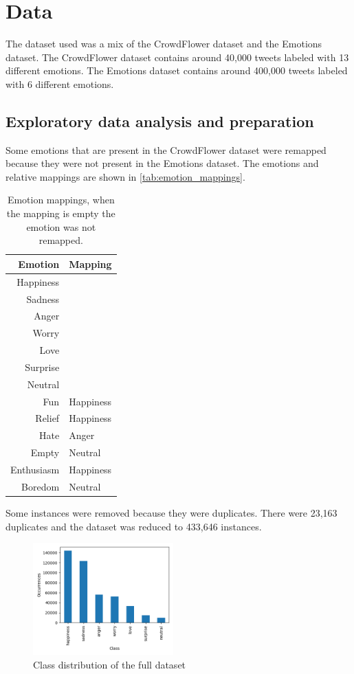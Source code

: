 \section{Data}
\label{sec:data}
The dataset used was a mix of the CrowdFlower 
dataset\cite{crowdflower_dataset} and the
Emotions dataset\cite{emotions_dataset}.
The CrowdFlower dataset contains around 40,000 tweets
labeled with 13 different emotions. The Emotions 
dataset contains around 400,000 tweets labeled with 6 
different emotions.

\subsection{Exploratory data analysis and preparation}
Some emotions that are present in the
CrowdFlower dataset were remapped because they
were not present in the Emotions dataset.
The emotions and relative mappings are shown
in \autoref{tab:emotion_mappings}.

\begin{table}[H]
    \centering
    \begin{tabular}{|r|l|}
        \hline
        Emotion & Mapping \\
        \hline
        Happiness & \\
        Sadness & \\
        Anger & \\
        Worry & \\
        Love & \\
        Surprise & \\
        Neutral & \\
        Fun  & Happiness \\
        Relief  & Happiness \\
        Hate  & Anger \\
        Empty  & Neutral \\
        Enthusiasm  & Happiness \\
        Boredom  & Neutral \\
        \hline
    \end{tabular}
    \caption{Emotion mappings, when the mapping is empty the emotion was not remapped.}
    \label{tab:emotion_mappings}
\end{table}

Some instances were removed because they were
duplicates. There were 23,163 duplicates and the
dataset was reduced to 433,646 instances.

\begin{figure}[H]
    \centering
    \includegraphics[width=0.48\textwidth]{images/class_distribution.png}
    \caption{Class distribution of the full dataset}
    \label{fig:class_distribution}
\end{figure}

